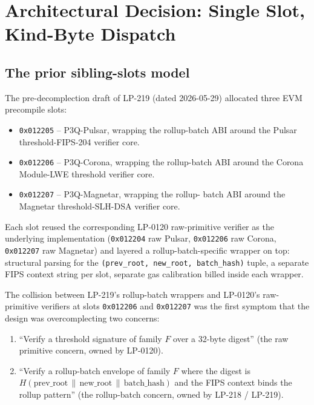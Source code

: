 \section{Architectural Decision: Single Slot, Kind-Byte Dispatch}
\label{sec:architectural-decision}

\subsection{The prior sibling-slots model}

The pre-decomplection draft of LP-219 (dated 2026-05-29)
allocated three EVM precompile slots:

\begin{itemize}[leftmargin=2em,nosep]
\item \texttt{0x012205} -- P3Q-Pulsar, wrapping the rollup-batch
  ABI around the Pulsar threshold-FIPS-204 verifier core.
\item \texttt{0x012206} -- P3Q-Corona, wrapping the rollup-batch
  ABI around the Corona Module-LWE threshold verifier
  core.
\item \texttt{0x012207} -- P3Q-Magnetar, wrapping the rollup-
  batch ABI around the Magnetar threshold-SLH-DSA verifier core.
\end{itemize}

Each slot reused the corresponding LP-0120 raw-primitive verifier
as the underlying implementation (\texttt{0x012204} raw Pulsar,
\texttt{0x012206} raw Corona, \texttt{0x012207} raw Magnetar) and
layered a rollup-batch-specific wrapper on top: structural
parsing for the \texttt{(prev\_root, new\_root, batch\_hash)}
tuple, a separate FIPS context string per slot, separate gas
calibration billed inside each wrapper.

The collision between LP-219's rollup-batch wrappers and
LP-0120's raw-primitive verifiers at slots \texttt{0x012206} and
\texttt{0x012207} was the first symptom that the design was
overcomplecting two concerns:

\begin{enumerate}[leftmargin=2em,nosep]
\item ``Verify a threshold signature of family $F$ over a 32-byte
  digest'' (the raw primitive concern, owned by LP-0120).
\item ``Verify a rollup-batch envelope of family $F$ where the
  digest is $H(\text{prev\_root} \,\|\, \text{new\_root} \,\|\,
  \text{batch\_hash})$ and the FIPS context binds the rollup
  pattern'' (the rollup-batch concern, owned by LP-218 /
  LP-219).
\end{enumerate}


